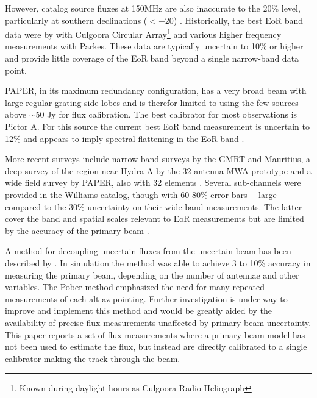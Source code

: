 \documentclass[preprint]{aastex}
\begin{document}
However, catalog source fluxes at 150MHz are also inaccurate to the 20\% level, particularly at southern declinations ($<-20$\arcdeg) . Historically, the best EoR band data were by \citet{Slee:1995p7541} with Culgoora Circular Array\footnote{Known during daylight hours as Culgoora Radio Heliograph} and various higher frequency measurements with Parkes.  These data are typically uncertain to 10\% or higher and provide little coverage of the EoR band beyond a single narrow-band data point. 

PAPER, in its maximum redundancy configuration, has a very broad beam with large regular grating side-lobes and is therefor limited to using the few sources above $\sim$50 Jy for flux calibration. The best calibrator for most observations is Pictor A. For this source the current best EoR band measurement is uncertain to 12\% and appears to imply spectral flattening in the EoR band \citep{Perley:1997p9312}.

More recent surveys include narrow-band surveys by the GMRT and Mauritius, a deep survey of the region near Hydra A by the 32 antenna MWA prototype \cite{Williams:2012p8768} and a wide field survey by PAPER, also with 32 elements \cite{Jacobs:2011p8438}. Several sub-channels were provided in the Williams catalog, though with 60-80\% error bars ---large compared to the 30\% uncertainty on their wide band measurements.  The latter cover the band and spatial scales relevant to EoR measurements but are limited by the accuracy of the primary beam \citep{Jacobs:2013p9713}.

A method for decoupling uncertain fluxes from the uncertain beam has been described by \citet{Pober:2012p8800}. In simulation the method was able to achieve 3 to 10\% accuracy in measuring the primary beam, depending on the number of antennae and other variables. The Pober method emphasized the need for many repeated measurements of each alt-az pointing. Further investigation is under way to improve and implement this method and would be greatly aided by the availability of precise flux measurements unaffected by primary beam uncertainty. This paper reports a set of flux measurements where a primary beam model has not been used to estimate the flux, but instead are directly calibrated to a single calibrator making the track through the beam.
\end{document}
